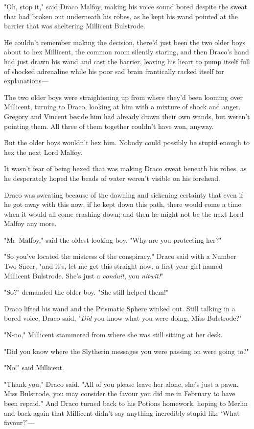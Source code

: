 "Oh, stop it," said Draco Malfoy, making his voice sound bored despite the
sweat that had broken out underneath his robes, as he kept his wand pointed at
the barrier that was sheltering Millicent Bulstrode.

He couldn't remember making the decision, there'd just been the two older boys
about to hex Millicent, the common room silently staring, and then Draco's hand
had just drawn his wand and cast the barrier, leaving his heart to pump itself
full of shocked adrenaline while his poor sad brain frantically racked itself
for explanations---

The two older boys were straightening up from where they'd been looming over
Millicent, turning to Draco, looking at him with a mixture of shock and anger.
Gregory and Vincent beside him had already drawn their own wands, but weren't
pointing them. All three of them together couldn't have won, anyway.

But the older boys wouldn't hex him. Nobody could possibly be stupid enough to
hex the next Lord Malfoy.

It wasn't fear of being hexed that was making Draco sweat beneath his robes, as
he desperately hoped the beads of water weren't visible on his forehead.

Draco was sweating because of the dawning and sickening certainty that even if
he got away with this now, if he kept down this path, there would come a time
when it would all come crashing down; and then he might not be the next Lord
Malfoy any more.

"Mr~Malfoy," said the oldest-looking boy. "Why are you protecting her?"

"So you've located the mistress of the conspiracy," Draco said with a Number
Two Sneer, "and it's, let me get this straight now, a first-year girl named
Millicent Bulstrode. She's just a \emph{conduit}, you \emph{nitwit!}"

"So?" demanded the older boy. "She still helped them!"

Draco lifted his wand and the Prismatic Sphere winked out. Still talking in a
bored voice, Draco said, "\emph{Did} you know what you were doing, Miss
Bulstrode?"

"N-no," Millicent stammered from where she was still sitting at her desk.

"Did you know where the Slytherin messages you were passing on were going to?"

"No!" said Millicent.

"Thank you," Draco said. "All of you please leave her alone, she's just a pawn.
Miss Bulstrode, you may consider the favour you did me in February to have been
repaid." And Draco turned back to his Potions homework, hoping to Merlin and
back again that Millicent didn't say anything incredibly stupid like `What
favour?'---

